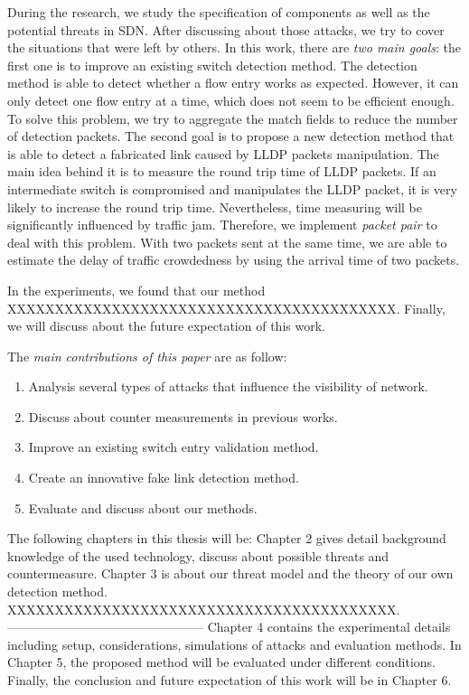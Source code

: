 During the research, we study the specification of components as well as the potential threats in SDN. After discussing about those attacks, we try to cover the situations that were left by others. In this work, there are \emph{two main goals}: the first one is to improve an existing switch detection method. The detection method is able to detect whether a flow entry works as expected. However, it can only detect one flow entry at a time, which does not seem to be efficient enough. To solve this problem, we try to aggregate the match fields to reduce the number of detection packets. The second goal is to propose a new detection method that is able to detect a fabricated link caused by LLDP packets manipulation. The main idea behind it is to measure the round trip time of LLDP packets. If an intermediate switch is compromised and manipulates the LLDP packet, it is very likely to increase the round trip time. Nevertheless, time measuring will be significantly influenced by traffic jam. Therefore, we implement \textit{packet pair} to deal with this problem. With two packets sent at the same time, we are able to estimate the delay of traffic crowdedness by using the arrival time of two packets.

In the experiments, we found that our method XXXXXXXXXXXXXXXXXXXXXXXXXXXXXXXXXXXXXXXXX. Finally, we will discuss about the future expectation of this work.

The \emph{main contributions of this paper} are as follow:

\begin{enumerate}
\item
Analysis several types of attacks that influence the visibility of network.
\item
Discuss about counter measurements in previous works.
\item
Improve an existing switch entry validation method.
\item
Create an innovative fake link detection method.
\item
Evaluate and discuss about our methods.
\end{enumerate}

The following chapters in this thesis will be: Chapter 2 gives detail background knowledge of the used technology, discuss about possible threats and countermeasure. Chapter 3 is about our threat model and the theory of our own detection method. XXXXXXXXXXXXXXXXXXXXXXXXXXXXXXXXXXXXXXXXX.
-----------------------------------------------
Chapter 4 contains the experimental details including setup, considerations, simulations of attacks and evaluation methods. In Chapter 5, the proposed method will be evaluated under different conditions. Finally, the conclusion and future expectation of this work will be in Chapter 6.